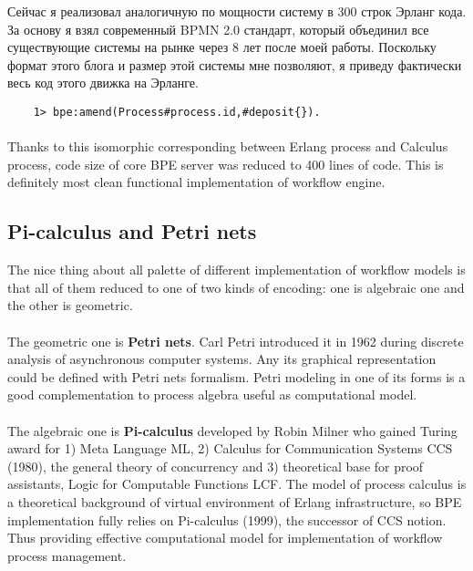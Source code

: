 Сейчас я реализовал аналогичную по мощности систему в 300
строк Эрланг кода. За основу я взял современный BPMN 2.0
стандарт, который объединил все существующие системы на
рынке через 8 лет после моей работы. Поскольку формат этого
блога и размер этой системы мне позволяют, я приведу
фактически весь код этого движка на Эрланге.

\vspace{1\baselineskip}
\begin{lstlisting}
    1> bpe:amend(Process#process.id,#deposit{}).
\end{lstlisting}

\paragraph{}
Thanks to this isomorphic corresponding between Erlang process and Calculus process,
code size of core BPE server was reduced to 400 lines of code. This is definitely
most clean functional implementation of workflow engine.

\subsection{Pi-calculus and Petri nets}
The nice thing about all palette of different implementation of workflow models is
that all of them reduced to one of two kinds of encoding: one is algebraic one and
the other is geometric.

\paragraph{}
The geometric one is {\bf Petri nets}. Carl Petri introduced it in 1962 during discrete
analysis of asynchronous computer systems. Any its graphical representation could be
defined with Petri nets formalism. Petri modeling in one of its forms is a good
complementation to process algebra useful as computational model.

\paragraph{}
The algebraic one is {\bf Pi-calculus} developed by Robin Milner who gained
Turing award for 1) Meta Language ML, 2) Calculus for Communication Systems CCS (1980),
the general theory of concurrency and 3) theoretical base for proof assistants,
Logic for Computable Functions LCF.
The model of process calculus is a theoretical
background of virtual environment of Erlang infrastructure, so BPE
implementation fully relies on Pi-calculus (1999), the successor of CCS notion.
Thus providing effective computational model for implementation of workflow
process management.

